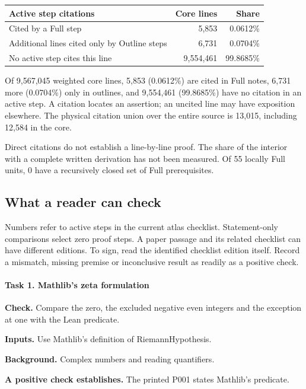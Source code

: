 \begin{center}\small\begin{tabular}{@{}lrr@{}}\toprule
Active step citations & Core lines & Share \\ \midrule
Cited by a Full step & 5,853 & 0.0612\% \\
Additional lines cited only by Outline steps & 6,731 & 0.0704\% \\
No active step cites this line & 9,554,461 & 99.8685\% \\
\bottomrule\end{tabular}\end{center}

Of 9,567,045 weighted core lines, 5,853 (0.0612\%) are cited in Full notes, 6,731 more (0.0704\%) only in outlines, and 9,554,461 (99.8685\%) have no citation in an active step. A citation locates an assertion; an uncited line may have exposition elsewhere. The physical citation union over the entire source is 13,015, including 12,584 in the core.

Direct citations do not establish a line-by-line proof. The share of the interior with a complete written derivation has not been measured. Of 55 locally Full units, 0 have a recursively closed set of Full prerequisites.

\subsection{What a reader can check}\label{v7:q2}

Numbers refer to active steps in the current atlas checklist. Statement-only comparisons select zero proof steps. A paper passage and its related checklist can have different editions. To sign, read the identified checklist edition itself. Record a mismatch, missing premise or inconclusive result as readily as a positive check.

\paragraph{Task 1. Mathlib’s zeta formulation}\label{v7:task-1}

\textbf{Check.} Compare the zero, the excluded negative even integers and the exception at one with the Lean predicate.

\textbf{Inputs.} Use Mathlib’s definition of RiemannHypothesis.

\textbf{Background.} Complex numbers and reading quantifiers.

\textbf{A positive check establishes.} The printed P001 states Mathlib’s predicate.

